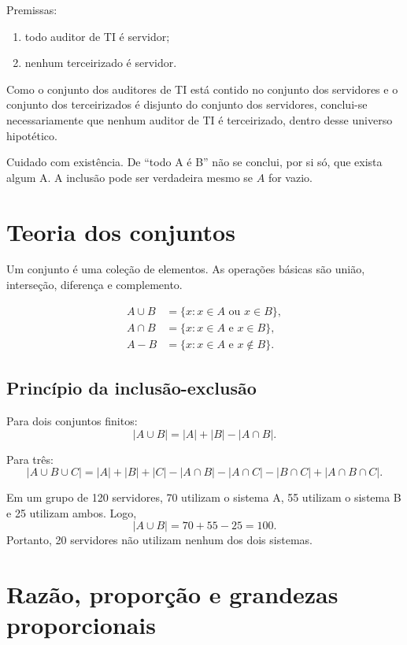 \begin{exemplo}
Premissas:
\begin{enumerate}
\item todo auditor de TI é servidor;
\item nenhum terceirizado é servidor.
\end{enumerate}

Como o conjunto dos auditores de TI está contido no conjunto dos servidores e o conjunto dos terceirizados é disjunto do conjunto dos servidores, conclui-se necessariamente que nenhum auditor de TI é terceirizado, dentro desse universo hipotético.
\end{exemplo}

Cuidado com existência. De ``todo A é B'' não se conclui, por si só, que exista algum A. A inclusão pode ser verdadeira mesmo se $A$ for vazio.

\section{Teoria dos conjuntos}

Um conjunto é uma coleção de elementos. As operações básicas são união, interseção, diferença e complemento.

\begin{align*}
A\cup B &= \{x: x\in A \text{ ou } x\in B\},\\
A\cap B &= \{x: x\in A \text{ e } x\in B\},\\
A-B &= \{x: x\in A \text{ e } x\notin B\}.
\end{align*}

\subsection{Princípio da inclusão-exclusão}

Para dois conjuntos finitos:
\[
|A\cup B|=|A|+|B|-|A\cap B|.
\]

Para três:
\[
|A\cup B\cup C|=|A|+|B|+|C|-|A\cap B|-|A\cap C|-|B\cap C|+|A\cap B\cap C|.
\]

\begin{exemplo}
Em um grupo de 120 servidores, 70 utilizam o sistema A, 55 utilizam o sistema B e 25 utilizam ambos. Logo,
\[
|A\cup B|=70+55-25=100.
\]
Portanto, 20 servidores não utilizam nenhum dos dois sistemas.
\end{exemplo}

\section{Razão, proporção e grandezas proporcionais}

